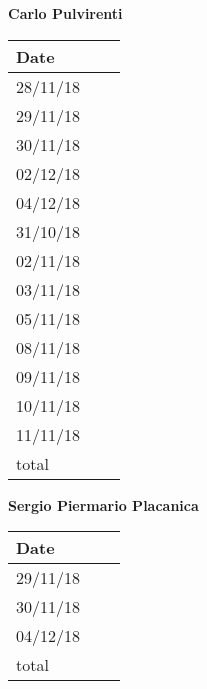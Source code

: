 \documentclass[../main.tex]{subfiles}
\begin{document}
\begin{center}
	{\bf Carlo Pulvirenti}
	\vspace{2mm}

		\begin{tabular}{p{1.3cm}|p{1.8cm}|p{6.7cm}}
			\hline
			\bf Date & \bf \makebox[1.8cm][c]{Hours} & \bf \makebox[6.7cm][c]{Description} \\
			\hline
			28/11/18 & \makebox[1.8cm][c]{1h} & \makebox[6.7cm][c]{Runtime View}\\
			29/11/18 & \makebox[1.8cm][c]{3h} & \makebox[6.7cm][c]{Runtime View}\\
			30/11/18 & \makebox[1.8cm][c]{2h} & \makebox[6.7cm][c]{Runtime View}\\
			02/12/18 & \makebox[1.8cm][c]{4h} & \makebox[6.7cm][c]{Runtime View}\\
			04/12/18 & \makebox[1.8cm][c]{2h} & \makebox[6.7cm][c]{Reviewing}\\
			31/10/18 & \makebox[1.8cm][c]{6h} & \makebox[6.7cm][c]{Use Cases, Scenarios}\\
			02/11/18 & \makebox[1.8cm][c]{4h} & \makebox[6.7cm][c]{Scenarios}\\
			03/11/18 & \makebox[1.8cm][c]{1h} & \makebox[6.7cm][c]{UML Class \& State Machine Diagrams}\\
			05/11/18 & \makebox[1.8cm][c]{4h} & \makebox[6.7cm][c]{Scenarios, Sequence Diagrams}\\
			08/11/18 & \makebox[1.8cm][c]{2h} & \makebox[6.7cm][c]{Sequence Diagramm, Alloy}\\
			09/11/18 & \makebox[1.8cm][c]{2h} & \makebox[6.7cm][c]{Sequence Diagram, Revisioning}\\
			10/11/18 & \makebox[1.8cm][c]{2h} & \makebox[6.7cm][c]{Revisioning}\\
			11/11/18 & \makebox[1.8cm][c]{4h} & \makebox[6.7cm][c]{Revisioning}\\
			total    & \makebox[1.8cm][c]{42h}
		\end{tabular}
\end{center}

\vspace{1cm}

\newpage

\begin{center}
	{\bf Sergio Piermario Placanica}
	\vspace{2mm}

		\begin{tabular}{p{1.3cm}|p{1.8cm}|p{6.7cm}}
			\hline
			\bf Date & \bf \makebox[1.8cm][c]{Hours} & \bf \makebox[6.7cm][c]{Description} \\
			\hline
			29/11/18 & \makebox[1.8cm][c]{2h} & \makebox[6.7cm][c]{Architechtural Design}\\
			30/11/18 & \makebox[1.8cm][c]{1h} & \makebox[6.7cm][c]{Architectural Design}\\
			04/12/18 & \makebox[1.8cm][c]{2h} & \makebox[6.7cm][c]{Reviewing}\\


			total    & \makebox[1.8cm][c]{5h}
		\end{tabular}
	\end{center}
\end{document}
